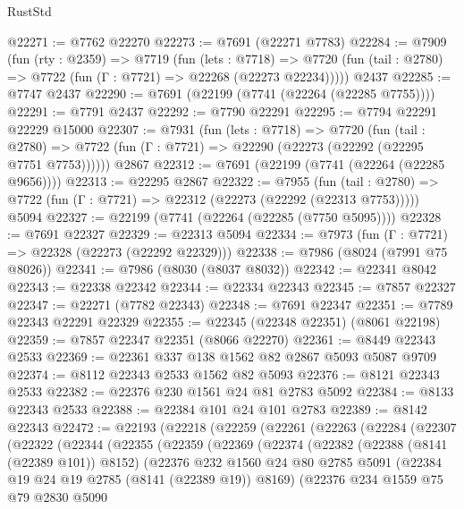 \begin{lexlean}{RustStd}
\begin{coremodule}
@22271 := @7762 @22270
@22273 := @7691 (@22271 @7783)
@22284 := @7909
    (fun (rty : @2359) =>
    @7719
      (fun (lets : @7718) =>
      @7720 (fun (tail : @2780) => @7722 (fun (Γ : @7721) => @22268 (@22273 @22234)))))
    @2437
@22285 := @7747 @2437
@22290 := @7691 (@22199 (@7741 (@22264 (@22285 @7755))))
@22291 := @7791 @2437
@22292 := @7790 @22291
@22295 := @7794 @22291 @22229 @15000
@22307 := @7931
    (fun (lets : @7718) =>
    @7720
      (fun (tail : @2780) =>
      @7722 (fun (Γ : @7721) => @22290 (@22273 (@22292 (@22295 @7751 @7753))))))
    @2867
@22312 := @7691 (@22199 (@7741 (@22264 (@22285 @9656))))
@22313 := @22295 @2867
@22322 := @7955
    (fun (tail : @2780) => @7722 (fun (Γ : @7721) => @22312 (@22273 (@22292 (@22313 @7753)))))
    @5094
@22327 := @22199 (@7741 (@22264 (@22285 (@7750 @5095))))
@22328 := @7691 @22327
@22329 := @22313 @5094
@22334 := @7973 (fun (Γ : @7721) => @22328 (@22273 (@22292 @22329)))
@22338 := @7986 (@8024 (@7991 @75 @8026))
@22341 := @7986 (@8030 (@8037 @8032))
@22342 := @22341 @8042
@22343 := @22338 @22342
@22344 := @22334 @22343
@22345 := @7857 @22327
@22347 := @22271 (@7782 @22343)
@22348 := @7691 @22347
@22351 := @7789 @22343 @22291 @22329
@22355 := @22345 (@22348 @22351) (@8061 @22198)
@22359 := @7857 @22347 @22351 (@8066 @22270)
@22361 := @8449 @22343 @2533
@22369 := @22361 @337 @138 @1562 @82 @2867 @5093 @5087 @9709
@22374 := @8112 @22343 @2533 @1562 @82 @5093
@22376 := @8121 @22343 @2533
@22382 := @22376 @230 @1561 @24 @81 @2783 @5092
@22384 := @8133 @22343 @2533
@22388 := @22384 @101 @24 @101 @2783
@22389 := @8142 @22343
@22472 := @22193
    (@22218
      (@22259
        (@22261
          (@22263
            (@22284
              (@22307
                (@22322
                  (@22344
                    (@22355
                      (@22359
                        (@22369
                          (@22374
                            (@22382
                              (@22388 (@8141 (@22389 @101)) @8152)
                              (@22376
                                @232
                                @1560
                                @24
                                @80
                                @2785
                                @5091
                                (@22384 @19 @24 @19 @2785 (@8141 (@22389 @19)) @8169)
                                (@22376
                                  @234
                                  @1559
                                  @75
                                  @79
                                  @2830
                                  @5090

\end{coremodule}
\end{lexlean}
